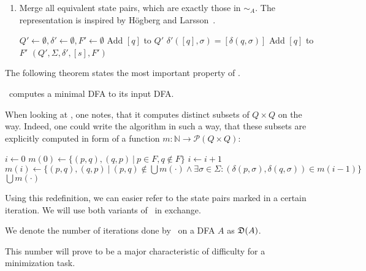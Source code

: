 \begin{enumerate}
	\item Merge all equivalent state pairs, which are exactly those in $\sim_A$. The representation is inspired by Högberg and Larsson~\cite[p.~10]{HL20}.
	
	\vspace{0.2cm}
	\begin{algorithmic}[1] \label{ch:2:minmerge}
            \State $Q' \gets \emptyset, \delta' \gets \emptyset, F' \gets \emptyset$
                \State Add $[q]$ to $Q'$ 
                    \State $\delta'([q], \sigma) = [\delta(q, \sigma)]$
                \EndFor
                    \State Add $[q]$ to $F'$
                \EndIf
            \EndFor
			\State \Return $(Q', \Sigma, \delta', [s], F')$
		\EndFunction
	\end{algorithmic}
\end{enumerate}
The following theorem states the most important property of \MinAlg.

\begin{theorem}\label{ch:2:min-alg-correct}
	\MinAlg\ computes a minimal DFA to its input DFA.
\end{theorem}

\noindent When looking at \CompDist, one notes, that it computes distinct subsets of $Q \times Q$ on the way. Indeed, one could write the algorithm in such a way, that these subsets are explicitly computed in form of a function $m\colon\mathbb{N}\to\mathcal{P}(Q\times Q)$:
\vspace{0.2cm}
\begin{algorithmic}[1] \label{ch:2:m-minmark}
	\State $i \gets 0$
	\State $m(0) \gets \{ (p,q), (q,p)\ |\ p \in F, q \notin F \}$
	\Do
		\State $i \gets i + 1$
		\State $m(i) \gets \{ (p,q), (q,p)\ |\ (p,q) \notin \bigcup{m(\cdot)} \land \exists \sigma \in \Sigma \colon (\delta(p,\sigma), \delta(q,\sigma)) \in m(i-1) \}$
	\State \Return $\bigcup{m(\cdot)}$
	\EndFunction
\end{algorithmic}
\vspace{0.2cm}
Using this redefinition, we can easier refer to the state pairs marked in a certain iteration. We will use both variants of \CompDist\ in exchange.
\begin{definition}\label{ch:2:def:D(A)}
	We denote the number of iterations done by \CompDist\ on a DFA $A$ as $\mathfrak{D}(A)$.
\end{definition}
\noindent This number will prove to be a major characteristic of difficulty for a minimization task.

